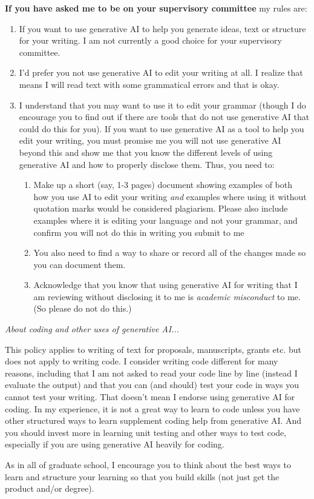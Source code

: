 \documentclass[11pt]{article}
\begin{document}
{\bf If you have asked me to be on your supervisory committee} my rules are:
\begin{enumerate}
\item If you want to use generative AI to help you generate ideas, text or structure for your writing. I am not currently a good choice for your supervisory committee. 
\item I’d prefer you not use generative AI to edit your writing at all. I realize that means I will read text with some grammatical errors and that is okay. 
\item I understand that you may want to use it to edit your grammar (though I do encourage you to find out if there are tools that do not use generative AI that could do this for you). If you want to use generative AI as a tool to help you edit your writing, you must promise me you will not use generative AI beyond this and show me that you know the different levels of using generative AI and how to properly disclose them. Thus, you need to:
\begin{enumerate}
\item Make up a short (say, 1-3 pages) document showing examples of both how you use AI to edit your writing \emph{and} examples where using it without quotation marks would be considered plagiarism. Please also include examples where it is editing your language and not your grammar, and confirm you will not do this in writing you submit to me
\item You also need to find a way to share or record all of the changes made so you can document them.
\item Acknowledge that you know that using generative AI for writing that I am reviewing without disclosing it to me is \emph{academic misconduct} to me. (So please do not do this.)
\end{enumerate}
\end{enumerate}

\newpage
\emph{About coding and other uses of generative AI...} 

This policy applies to writing of text for proposals, manuscripts, grants etc. but does not apply to writing code. I consider writing code different for many reasons, including that I am not asked to read your code line by line (instead I evaluate the output) and that you can (and should) test your code in ways you cannot test your writing. That doesn't mean I endorse using generative AI for coding. In my experience, it is not a great way to learn to code unless you have other structured ways to learn supplement coding help from generative AI. And you should invest more in learning unit testing and other ways to test code, especially if you are using generative AI heavily for coding. 

As in all of graduate school, I encourage you to think about the best ways to learn and structure your learning so that you build skills (not just get the product and/or degree).

\end{document}
